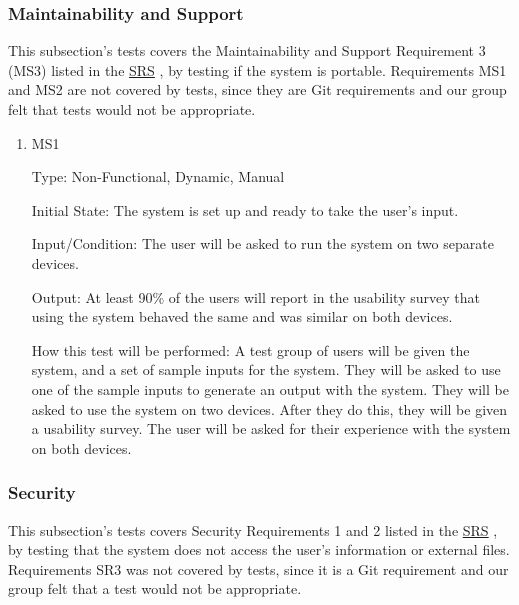 \documentclass[12pt, titlepage]{article}
\begin{document}
\subsubsection{Maintainability and Support}
This subsection's tests covers the Maintainability and Support Requirement 3 (MS3) listed in the \href{https://github.com/paezha/PyERT-BLACK/blob/main/docs/SRS/SRS.pdf}{SRS} \citep{SRS}, by testing if the system is portable. Requirements MS1 and MS2 are not covered by tests, since they are Git requirements and our group felt that tests would not be appropriate.

\begin{enumerate}

\item{MS1\\}\label{MS1}

Type: Non-Functional, Dynamic, Manual
					
Initial State: 
The system is set up and ready to take the user's input.

Input/Condition: 
The user will be asked to run the system on two separate devices.

Output: 
At least 90\% of the users will report in the usability survey that using the system behaved the same and was similar on both devices.

How this test will be performed: 
A test group of users will be given the system, and a set of sample inputs for the system. They will be asked to use one of the sample inputs to generate an output with the system. They will be asked to use the system on two devices. After they do this, they will be given a usability survey. The user will be asked for their experience with the system on both devices.

\end{enumerate}

\subsubsection{Security}
This subsection's tests covers Security Requirements 1 and 2 listed in the \href{https://github.com/paezha/PyERT-BLACK/blob/main/docs/SRS/SRS.pdf}{SRS} \citep{SRS}, by testing that the system does not access the user's information or external files. Requirements SR3 was not covered by tests, since it is a Git requirement and our group felt that a test would not be appropriate.
\end{document}
